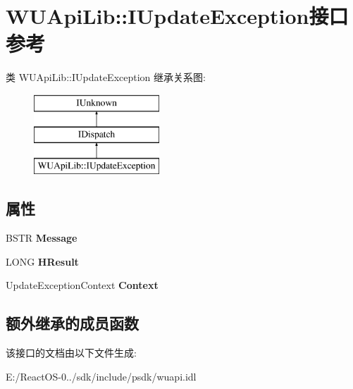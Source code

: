 \hypertarget{interface_w_u_api_lib_1_1_i_update_exception}{}\section{W\+U\+Api\+Lib\+:\+:I\+Update\+Exception接口 参考}
\label{interface_w_u_api_lib_1_1_i_update_exception}
类 W\+U\+Api\+Lib\+:\+:I\+Update\+Exception 继承关系图\+:\begin{figure}[H]
\begin{center}
\leavevmode
\includegraphics[height=3.000000cm]{interface_w_u_api_lib_1_1_i_update_exception}
\end{center}
\end{figure}
\subsection*{属性}
\begin{DoxyCompactItemize}
\item 
\mbox{\label{interface_w_u_api_lib_1_1_i_update_exception_a773e5d6394845184b61d644ed80ef68d}} 
B\+S\+TR {\bfseries Message}
\item 
\mbox{\label{interface_w_u_api_lib_1_1_i_update_exception_a9188b2643441662af47132908bff1fc2}} 
L\+O\+NG {\bfseries H\+Result}
\item 
\mbox{\label{interface_w_u_api_lib_1_1_i_update_exception_a78b906b54b846aeb94fa609421a0d71c}} 
Update\+Exception\+Context {\bfseries Context}
\end{DoxyCompactItemize}
\subsection*{额外继承的成员函数}


该接口的文档由以下文件生成\+:\begin{DoxyCompactItemize}
\item 
E\+:/\+React\+O\+S-\/0../sdk/include/psdk/wuapi.\+idl\end{DoxyCompactItemize}
